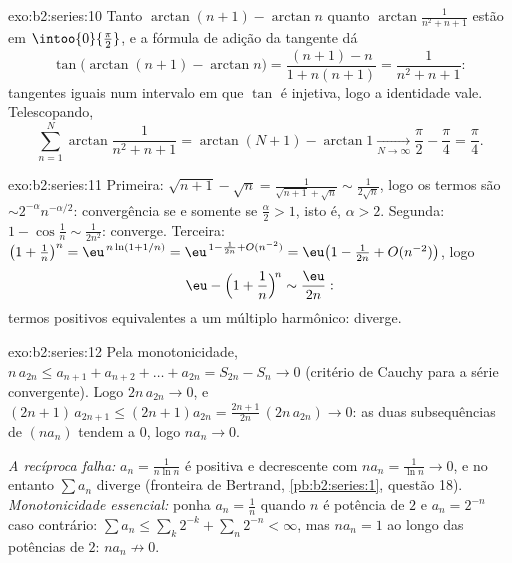 \begin{solution}{exo:b2:series:10}
Tanto $\arctan(n+1) - \arctan n$ quanto
$\arctan\frac{1}{n^2+n+1}$ estão em $\intoo{0}{\frac\pi2}$, e a
fórmula de adição da tangente dá
\[
\tan\bigl(\arctan(n{+}1) - \arctan n\bigr)
= \frac{(n+1) - n}{1 + n(n+1)} = \frac{1}{n^2 + n + 1} :
\]
tangentes iguais num intervalo em que $\tan$ é injetiva, logo a
identidade vale. Telescopando,
\[
\sum_{n=1}^{N}\arctan\frac{1}{n^2+n+1}
= \arctan(N{+}1) - \arctan 1 \xrightarrow[N\to\infty]{}
\frac\pi2 - \frac\pi4 = \frac\pi4 .
\]

\end{solution}

\begin{solution}{exo:b2:series:11}
Primeira: $\sqrt{n+1} - \sqrt n = \frac{1}{\sqrt{n+1} + \sqrt n}
\sim \frac{1}{2\sqrt n}$, logo os termos são $\sim
2^{-\alpha}n^{-\alpha/2}$: convergência se e somente se $\frac\alpha2 > 1$,
isto é, $\alpha > 2$. Segunda: $1 - \cos\frac1n \sim
\frac{1}{2n^2}$: converge. Terceira: $\bigl(1 + \frac1n\bigr)^n =
\eu^{\,n\ln(1 + 1/n)} = \eu^{\,1 - \frac1{2n} + O(n^{-2})} =
\eu\bigl(1 - \frac{1}{2n} + O(n^{-2})\bigr)$, logo
\[
\eu - \Bigl(1 + \frac1n\Bigr)^{\!n} \sim \frac{\eu}{2n} :
\]
termos positivos equivalentes a um múltiplo harmônico: diverge.
\end{solution}

\begin{solution}{exo:b2:series:12}
Pela monotonicidade, $n\,a_{2n} \leq a_{n+1} + a_{n+2} + \dots +
a_{2n} = S_{2n} - S_n \to 0$ (critério de Cauchy para a
série convergente). Logo $2n\,a_{2n} \to 0$, e $(2n{+}1)\,
a_{2n+1} \leq (2n{+}1)a_{2n} = \frac{2n+1}{2n}\,(2n\,a_{2n}) \to
0$: as duas subsequências de $(na_n)$ tendem a $0$, logo $na_n \to 0$.

\emph{A recíproca falha:} $a_n = \frac1{n\ln n}$ é positiva e
decrescente com $na_n = \frac1{\ln n} \to 0$, e no entanto $\sum a_n$
diverge (fronteira de Bertrand, \cref{pb:b2:series:1}, questão
18). \emph{Monotonicidade essencial:} ponha $a_n = \frac1n$ quando $n$
é potência de $2$ e $a_n = 2^{-n}$ caso contrário: $\sum a_n \leq
\sum_k 2^{-k} + \sum_n 2^{-n} < \infty$, mas $na_n = 1$ ao longo
das potências de $2$: $na_n \not\to 0$.
\end{solution}

